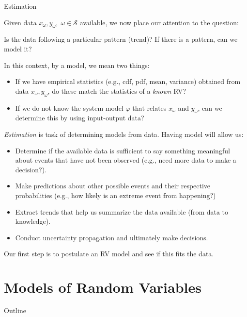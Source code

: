\documentclass[9pt]{beamer}
\begin{document}
%
\begin{frame}{Estimation}

Given data $x_\omega, y_\omega,\; \omega \in \mathcal{S}$ available, we now place our attention to the question:
\begin{block}{}
Is the data following a particular pattern (trend)? If there is a pattern, can we model it? 
\end{block}
In this context, by a model, we mean two things: 
\begin{itemize}
 \setlength{\itemsep}{5pt}
\item If we have empirical statistics (e.g., cdf, pdf, mean, variance) obtained from data $x_\omega,y_\omega$, do these match the statistics of a {\em known} RV?
\item If we do not know the system model $\varphi$ that relates $x_\omega$ and $y_\omega$, can we determine this by using input-output data? 
\end{itemize}
{\em Estimation} is task of determining models from data.  Having model will allow us:
\begin{block}{}
\begin{itemize}
\item Determine if the available data is sufficient to say something meaningful about events that have not been observed (e.g., need more data to make a decision?). 
\item Make predictions about other possible events and their respective probabilities (e.g., how likely is an extreme event from happening?)
\item Extract trends that help us summarize the data available (from data to knowledge). 
\item Conduct uncertainty propagation and ultimately make decisions. 
\end{itemize}
\end{block}
Our first step is to postulate an RV model and see if this fits the data. 
\end{frame}

\section{Models of Random Variables}
\begin{frame}{Outline}
\tableofcontents[currentsection]
\end{frame}
\end{document}
